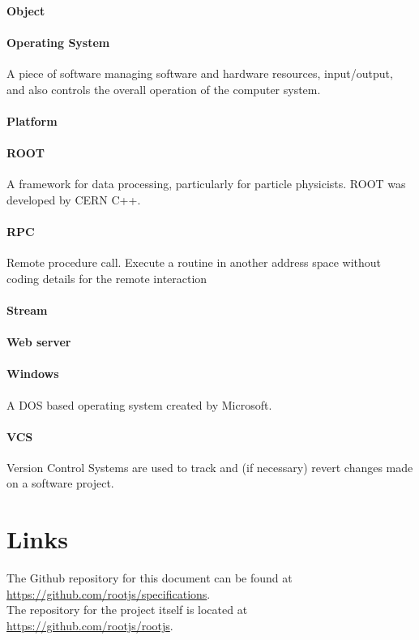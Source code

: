 \paragraph{Object}

\paragraph{Operating System}
A piece of software managing software and hardware resources, input/output, and also controls the overall operation of the computer system.
\paragraph{Platform}

\paragraph{ROOT}
A framework for data processing, particularly for particle physicists. ROOT was developed by CERN C++.


\paragraph{RPC}
Remote procedure call. Execute a routine in another address space without coding details for the remote interaction

\paragraph{Stream}

\paragraph{Web server}

\paragraph{Windows}
A DOS based operating system created by Microsoft.

\paragraph{VCS}
Version Control Systems are used to track and (if necessary) revert changes made on a software project.

\pagebreak[4]

\section{Links}

The Github repository for this document can be found at \url{https://github.com/rootjs/specifications}. \\
The repository for the project itself is located at \url{https://github.com/rootjs/rootjs}.
